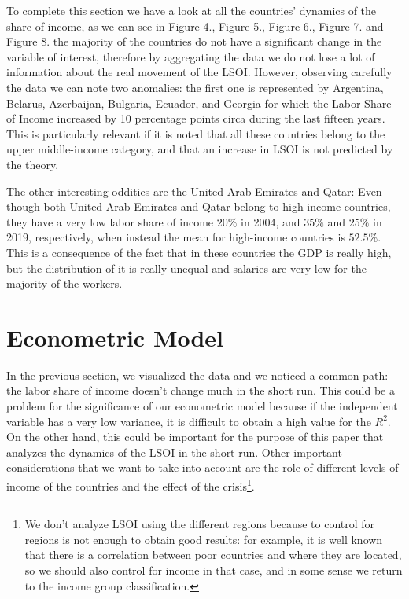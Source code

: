 \documentclass[12pt, letterpaper]{article}
\numberwithin{table}{section}   %
\begin{document}
To complete this section we have a look at all the countries' dynamics of the share of income, as we can see in Figure 4., Figure 5., Figure 6., Figure 7. and Figure 8. the majority of the countries do not have a significant change in the variable of interest, therefore by aggregating the data we do not lose a lot of information about the real movement of the LSOI. However, observing carefully the data we can note two anomalies: the first one is represented by Argentina, Belarus, Azerbaijan, Bulgaria, Ecuador, and Georgia for which the Labor Share of Income increased by 10 percentage points circa during the last fifteen years. This is particularly relevant if it is noted that all these countries belong to the upper middle-income category, and that an increase in LSOI is not predicted by the theory.

The other interesting oddities are the United Arab Emirates and Qatar: Even though both United Arab Emirates and Qatar belong to high-income countries, they have a very low labor share of income $20\%$ in 2004, and $35\%$ and $25\%$ in 2019, respectively, when instead the mean for high-income countries is $52.5\%$. This is a consequence of the fact that in these countries the GDP is really high, but the distribution of it is really unequal and salaries are very low for the majority of the workers.

\section{Econometric Model}\label{sec_5}
In the previous section, we visualized the data and we noticed a common path: the labor share of income doesn't change much in the short run. This could be a problem for the significance of our econometric model because if the independent variable has a very low variance, it is difficult to obtain a high value for the $R^2$. On the other hand, this could be important for the purpose of this paper that analyzes the dynamics of the LSOI in the short run. Other important considerations that we want to take into account are the role of different levels of income of the countries and the effect of the crisis\footnote{We don't analyze LSOI using the different regions because to control for regions is not enough to obtain good results: for example, it is well known that there is a correlation between poor countries and where they are located, so we should also control for income in that case, and in some sense we return to the income group classification.}.
\end{document}
